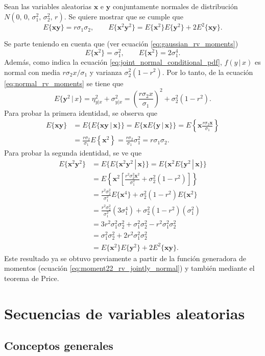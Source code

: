 \documentclass[a4paper]{report}
\newcommand{\x}{\mathbf{x}}
\newcommand{\y}{\mathbf{y}}
\begin{document}
Sean las variables aleatorias \(\x\) e \(\y\) conjuntamente normales de distribución \(N(0,\,0,\,\sigma_1^2,\,\sigma_2^2,\,r)\). Se quiere mostrar que se cumple que
\[
 E\{\x\y\}=r\sigma_1\sigma_2,\qquad E\{\x^2\y^2\}=E\{\x^2\}E\{\y^2\}+2E^2\{\x\y\}.
\]

Se parte teniendo en cuenta que (ver ecuación \ref{eq:gaussian_rv_moments})
\[
 E\{\x^2\}=\sigma_1^2,\qquad E\{\x^2\}=2\sigma_1^4.
\]
Además, como indica la ecuación \ref{eq:joint_normal_conditional_pdf}, \(f(y\,|\,x)\) es normal con media \(r\sigma_2x/\sigma_1\) y varianza \(\sigma_2^2(1-r^2)\). Por lo tanto, de la ecuación \ref{eq:normal_rv_moments} se tiene que
\[
 E\{\y^2\,|\,x\}=\eta_{y|x}^2+\sigma_{y|x}^2=\left(\frac{r\sigma_2x}{\sigma_1}\right)^2+\sigma_2^2(1-r^2).
\]
Para probar la primera identidad, se observa que
\begin{align*}
 E\{\x\y\}&=E\{E\{\x\y\,|\,\x\}\}=E\{\x E\{\y\,|\,\x\}\}=E\left\{\x\frac{r\sigma_2\x}{\sigma_1}\right\}\\
  &=\frac{r\sigma_2}{\sigma_1}E\left\{\x^2\right\}=\frac{r\sigma_2}{\sigma_1}\sigma_1^2
  =r\sigma_1\sigma_2.
\end{align*}
Para probar la segunda identidad, se ve que
\begin{align*}
 E\{\x^2\y^2\}&=E\{E\{\x^2\y^2\,|\,\x\}\}=E\{\x^2 E\{\y^2\,|\,\x\}\}\\
  &=E\left\{\x^2\left[\frac{r^2\sigma_2^2\x^2}{\sigma_1^2}+\sigma_2^2(1-r^2)\right]\right\}\\
  &=\frac{r^2\sigma_2^2}{\sigma_1^2}E\{\x^4\}+\sigma_2^2(1-r^2)E\{\x^2\}\\
  &=\frac{r^2\sigma_2^2}{\sigma_1^2}(3\sigma_1^4)+\sigma_2^2(1-r^2)(\sigma_1^2)\\
  &=3r^2\sigma_1^2\sigma_2^2+\sigma_1^2\sigma_2^2-r^2\sigma_1^2\sigma_2^2\\
  &=\sigma_1^2\sigma_2^2+2r^2\sigma_1^2\sigma_2^2\\
  &=E\{\x^2\}E\{\y^2\}+2E^2\{\x\y\}.
\end{align*}
Este resultado ya se obtuvo previamente a partir de la función generadora de momentos (ecuación \ref{eq:moment22_rv_jointly_normal}) y también mediante el teorema de Price.

\chapter{Secuencias de variables aleatorias}

\section{Conceptos generales}
\end{document}
